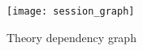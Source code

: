 \documentclass[10pt,a4paper]{article}
\begin{document}
\begin{figure}
\begin{center}
  \texttt{[image: session\_graph]}
\end{center}
\caption{Theory dependency graph}
\label{fig:thys}
\end{figure}

\newpage





\end{document}
